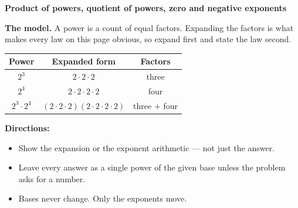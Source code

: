 \documentclass[12pt]{article}
\begin{document}

\noindent\textbf{Product of powers, quotient of powers, zero and negative exponents}

\vspace{0.15cm}
\noindent\textbf{The model.} A power is a count of equal factors. Expanding the
factors is what makes every law on this page obvious, so expand first and state
the law second.

\begin{center}
\begin{tabular}{|c|c|c|}
\hline
\textbf{Power} & \textbf{Expanded form} & \textbf{Factors} \\ \hline
$2^3$ & $2 \cdot 2 \cdot 2$ & three \\ \hline
$2^4$ & $2 \cdot 2 \cdot 2 \cdot 2$ & four \\ \hline
$2^3 \cdot 2^4$ & $(2 \cdot 2 \cdot 2)(2 \cdot 2 \cdot 2 \cdot 2)$ & three $+$ four \\ \hline
\end{tabular}
\end{center}

\noindent\textbf{Directions:}
\begin{itemize}[leftmargin=0.9cm, itemsep=2pt, topsep=3pt]
  \item Show the expansion or the exponent arithmetic --- not just the answer.
  \item Leave every answer as a single power of the given base unless the
        problem asks for a number.
  \item Bases never change. Only the exponents move.
\end{itemize}





\end{document}

